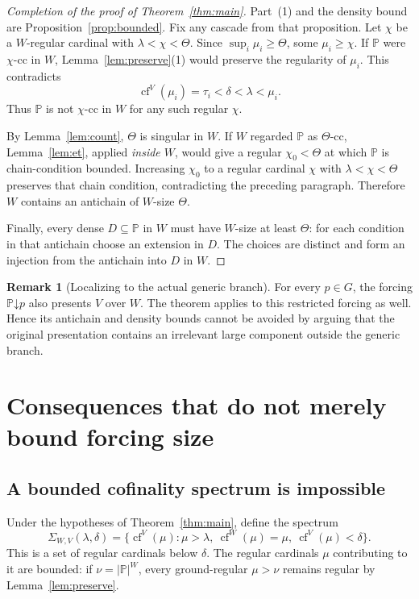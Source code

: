 \documentclass[11pt,letterpaper]{article}
\theoremstyle{definition}
\newtheorem{remark}[definition]{Remark}
\numberwithin{equation}{section}
\newcommand{\cf}{\operatorname{cf}}
\newcommand{\PP}{\mathbb P}
\newcommand{\cc}{\text{-cc}}
\begin{document}
\begin{proof}[Completion of the proof of Theorem~\ref{thm:main}]
Part~(1) and the density bound are Proposition~\ref{prop:bounded}. Fix any cascade from that proposition. Let $\chi$ be a $W$-regular cardinal with
$\lambda<\chi<\Theta$. Since $\sup_i\mu_i\ge\Theta$, some $\mu_i\ge\chi$.
If $\PP$ were $\chi\cc$ in $W$, Lemma~\ref{lem:preserve}(1) would preserve the regularity of $\mu_i$. This contradicts
\[
\cf^V(\mu_i)=\tau_i<\delta<\lambda<\mu_i.
\]
Thus $\PP$ is not $\chi\cc$ in $W$ for any such regular $\chi$.

By Lemma~\ref{lem:count}, $\Theta$ is singular in $W$. If $W$ regarded $\PP$ as $\Theta\cc$, Lemma~\ref{lem:et}, applied \emph{inside $W$}, would give a regular $\chi_0<\Theta$ at which $\PP$ is chain-condition bounded. Increasing $\chi_0$ to a regular cardinal $\chi$ with $\lambda<\chi<\Theta$ preserves that chain condition, contradicting the preceding paragraph. Therefore $W$ contains an antichain of $W$-size $\Theta$.

Finally, every dense $D\subseteq\PP$ in $W$ must have $W$-size at least $\Theta$: for each condition in that antichain choose an extension in $D$. The choices are distinct and form an injection from the antichain into $D$ in $W$.
\end{proof}

\begin{remark}[Localizing to the actual generic branch]\label{rem:cones}
For every $p\in G$, the forcing $\PP\mathord\downarrow p$ also presents $V$ over $W$. The theorem applies to this restricted forcing as well. Hence its antichain and density bounds cannot be avoided by arguing that the original presentation contains an irrelevant large component outside the generic branch.
\end{remark}

\section{Consequences that do not merely bound forcing size}\label{sec:spectrum}

\subsection{A bounded cofinality spectrum is impossible}

Under the hypotheses of Theorem~\ref{thm:main}, define the spectrum
\[
\Sigma_{W,V}(\lambda,\delta)=
\{\cf^V(\mu):\mu>\lambda,\ \cf^W(\mu)=\mu,\ \cf^V(\mu)<\delta\}.
\]
This is a set of regular cardinals below $\delta$. The regular cardinals $\mu$ contributing to it are bounded: if $\nu=|\PP|^W$, every ground-regular $\mu>\nu$ remains regular by Lemma~\ref{lem:preserve}.
\end{document}
